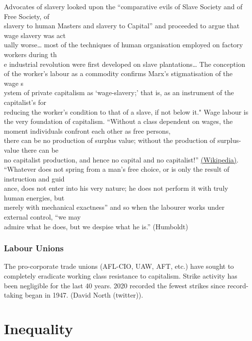 \documentclass[
]{book}
\begin{document}
Advocates of slavery looked upon the ``comparative evils of Slave Society and of Free Society, of\\
slavery to human Masters and slavery to Capital'' and proceeded to argue that wage slavery was act\\
ually worse\ldots{} most of the techniques of human organisation employed on factory workers during th\\
e industrial revolution were first developed on slave plantations\ldots{}
The conception of the worker's labour as a commodity confirms Marx's stigmatisation of the wage s\\
ystem of private capitalism as `wage-slavery;' that is, as an instrument of the capitalist's for\\
reducing the worker's condition to that of a slave, if not below it."
Wage labour is the very foundation of capitalism.
``Without a class dependent on wages, the moment individuals confront each other as free persons,\\
there can be no production of surplus value; without the production of surplus-value there can be\\
no capitalist production, and hence no capital and no capitalist!''
\href{https://en.wikipedia.org/wiki/Wage_labour}{(Wikipedia)}.
``Whatever does not spring from a man's free choice, or is only the result of instruction and guid\\
ance, does not enter into his very nature; he does not perform it with truly human energies, but\\
merely with mechanical exactness'' and so when the labourer works under external control, ``we may\\
admire what he does, but we despise what he is.'' (Humboldt)

\hypertarget{labour-unions}{%
\subsection{Labour Unions}\label{labour-unions}}

The pro-corporate trade unions (AFL-CIO, UAW, AFT, etc.) have sought to completely eradicate working class resistance to capitalism.
Strike activity has been negligible for the last 40 years. 2020 recorded the fewest strikes since record-taking began in 1947. (David North (twitter)).

\hypertarget{inequality}{%
\chapter{Inequality}\label{inequality}}
\end{document}

